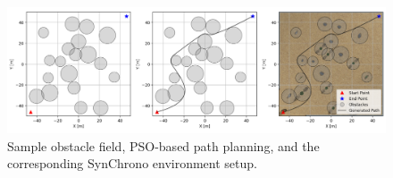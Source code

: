 \documentclass[12pt,twocolumn]{article}
\newcommand{\chrono}{Chrono}
\newcommand{\synchrono}{Syn\chrono{}}
\begin{document}




\begin{figure}
    \centering
    \includegraphics[width=\textwidth]{Figs/StatisticalAnalysis/path_gen_progression.png}
    \caption{Sample obstacle field, PSO-based path planning, and the corresponding SynChrono environment setup.}   
    \label{fig:synchronodemoexample}
\end{figure}
\end{document}
